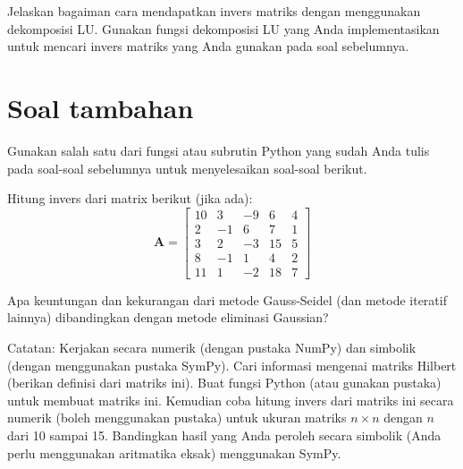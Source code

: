 \begin{soal}
Jelaskan bagaiman cara mendapatkan invers matriks dengan menggunakan
dekomposisi LU. Gunakan fungsi dekomposisi LU yang Anda implementasikan
untuk mencari invers matriks yang Anda gunakan pada soal sebelumnya.
\end{soal}



\section{Soal tambahan}

Gunakan salah satu dari fungsi atau subrutin Python yang sudah Anda tulis
pada soal-soal sebelumnya untuk menyelesaikan soal-soal berikut.

\begin{soal}
Hitung invers dari matrix berikut (jika ada):
\begin{equation*}
\mathbf{A} = \begin{bmatrix}
10 & 3 & -9 & 6 & 4 \\
2 & -1 & 6 & 7 & 1 \\
3 & 2 & -3 & 15 & 5 \\
8 & -1 & 1 & 4 & 2 \\
11 & 1 & -2 & 18 & 7
\end{bmatrix}
\end{equation*}
\end{soal}











\begin{soal}
Apa keuntungan dan kekurangan dari metode Gauss-Seidel (dan metode iteratif lainnya)
dibandingkan dengan metode eliminasi Gaussian?
\end{soal}


\begin{soal}
Catatan: Kerjakan secara numerik (dengan pustaka NumPy) dan simbolik (dengan
menggunakan pustaka SymPy).
Cari informasi mengenai matriks Hilbert (berikan definisi dari
matriks ini). Buat fungsi Python (atau gunakan pustaka)
untuk membuat matriks ini. Kemudian coba hitung invers dari matriks ini secara
numerik (boleh menggunakan pustaka) untuk
ukuran matriks $n \times n$ dengan $n$ dari 10 sampai 15. Bandingkan hasil yang Anda peroleh
secara simbolik (Anda perlu menggunakan aritmatika eksak) menggunakan SymPy.
\end{soal}



